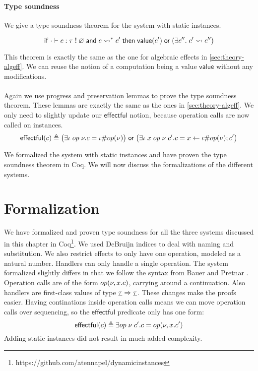 {\paragraph{Type soundness}
We give a type soundness theorem for the system with static instances.

\begin{theorem}
\[
	\mathsf{if}\;
		\cdot \vdash c : \tau \; ! \; \varnothing
		\;\mathsf{and}\;
		c \rightsquigarrow^* c'
	\;\mathsf{then}\;
		\mathsf{value}(c')
		\;\mathsf{or}\;
		(\exists c''.\; c' \rightsquigarrow c'')
\]
\end{theorem}

This theorem is exactly the same as the one for algebraic effects in \cref{sec:theory-algeff}.
We can reuse the notion of a computation being a value $\mathsf{value}$ without any modifications.
\\\\
Again we use progress and preservation lemmas to prove the type soundness theorem.
These lemmas are exactly the same as the ones in \cref{sec:theory-algeff}.
We only need to slightly update our $\mathsf{effectful}$ notion, because operation calls are now called on instances.
\[ \mathsf{effectful}(c) \triangleq \big(\exists \iota \; op \; \nu. c = \iota \# op(\nu)\big) \;\mathsf{or}\; \big(\exists \iota \; x \; op \; \nu \; c'. c = x \leftarrow \iota \# op(\nu) ; c'\big) \]

We formalized the system with static instances and have proven the type soundness theorem in Coq.
We will now discuss the formalizations of the different systems.

\section{Formalization}
\label{sec:formalization}

We have formalized and proven type soundness for all the three systems discussed in this chapter in Coq\footnote{https://github.com/atennapel/dynamicinstances}.
We used DeBruijn indices to deal with naming and substitution.
We also restrict effects to only have one operation, modeled as a natural number.
Handlers can only handle a single operation.
The system formalized slightly differs in that we follow the syntax from Bauer and Pretnar \autocite{eff2}.
Operation calls are of the form $op(\nu, x. c)$, carrying around a continuation.
Also handlers are first-class values of type $\underline{\tau} \Rightarrow \underline{\tau}$.
These changes make the proofs easier.
Having continations inside operation calls means we can move operation calls over sequencing, so the $\mathsf{effectful}$ predicate only has one form:
\[ \mathsf{effectful}(c) \triangleq \exists op \; \nu \; c'. c = op(\nu, x. c') \]
Adding static instances did not result in much added complexity.
}